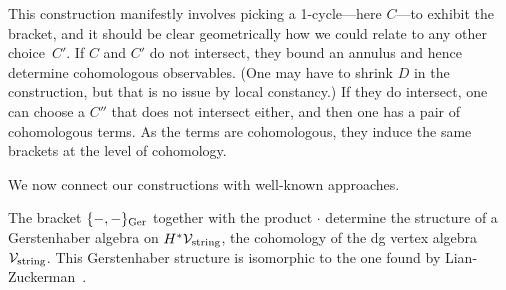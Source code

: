 
\begin{rmk}
This construction manifestly involves picking a 1-cycle---here $C$---to exhibit the bracket, 
and it should be clear geometrically how we could relate to any other choice~$C'$.
If $C$ and $C'$ do not intersect, they bound an annulus and hence determine cohomologous observables.
(One may have to shrink $D$ in the construction, but that is no issue by local constancy.)
If they do intersect, one can choose a $C''$ that does not intersect either, and then one has a pair of cohomologous terms.
As the terms are cohomologous, they induce the same brackets at the level of cohomology.
\end{rmk}

We now connect our constructions with well-known approaches.

\begin{prop} 
The bracket $\{-,-\}_{\rm Ger}$ together with the product $\cdot$ determine the structure of a Gerstenhaber algebra on $H^* \mathcal{V}_{\rm string}$, 
the cohomology of the dg vertex algebra $\mathcal{V}_{\rm string}$. 
This Gerstenhaber structure is isomorphic to the one found by Lian-Zuckerman~\cite{LZ1}.
\end{prop}

